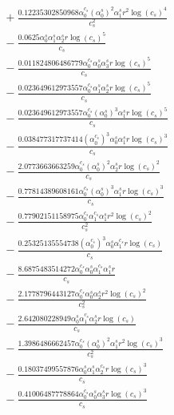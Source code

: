 \documentclass[10pt]{article}
\begin{document}
\begin{align*}
&{}  + \frac{0.12235302850968 \alpha_{0}^{c_s} \left(\alpha_{0}^s\right)^{2} \alpha_{1}^s r^{2} \log{\left(c_{s} \right)}^{4}}{c_{s}^{2}} \\
&{}  - \frac{0.0625 \alpha_{0}^s \alpha_{1}^s \alpha_{2}^s r \log{\left(c_{s} \right)}^{5}}{c_{s}} \\
&{}  - \frac{0.011824806486779 \alpha_{0}^{c_s} \alpha_{0}^s \alpha_{3}^s r \log{\left(c_{s} \right)}^{5}}{c_{s}} \\
&{}  - \frac{0.023649612973557 \alpha_{0}^{c_s} \alpha_{1}^s \alpha_{2}^s r \log{\left(c_{s} \right)}^{5}}{c_{s}} \\
&{}  - \frac{0.023649612973557 \alpha_{0}^{c_s} \left(\alpha_{0}^s\right)^{3} \alpha_{1}^s r \log{\left(c_{s} \right)}^{5}}{c_{s}} \\
&{}  - \frac{0.038477317737414 \left(\alpha_{0}^{c_s}\right)^{3} \alpha_{0}^s \alpha_{1}^s r \log{\left(c_{s} \right)}^{3}}{c_{s}} \\
&{}  - \frac{2.0773663663259 \alpha_{0}^{c_s} \left(\alpha_{0}^s\right)^{2} \alpha_{2}^s r \log{\left(c_{s} \right)}^{2}}{c_{s}} \\
&{}  - \frac{0.77814389608161 \alpha_{0}^{c_s} \left(\alpha_{0}^s\right)^{3} \alpha_{1}^s r \log{\left(c_{s} \right)}^{3}}{c_{s}} \\
&{}  - \frac{0.77902151158975 \alpha_{0}^{c_s} \alpha_{1}^{c_s} \alpha_{1}^s r^{2} \log{\left(c_{s} \right)}^{2}}{c_{s}^{2}} \\
&{}  - \frac{0.25325135554738 \left(\alpha_{0}^{c_s}\right)^{3} \alpha_{0}^s \alpha_{1}^{c_s} r \log{\left(c_{s} \right)}}{c_{s}} \\
&{}  - \frac{8.6875483514272 \alpha_{0}^{c_s} \alpha_{0}^s \alpha_{1}^{c_s} \alpha_{1}^s r}{c_{s}} \\
&{}  - \frac{2.1778796443127 \alpha_{0}^{c_s} \alpha_{0}^s \alpha_{2}^s r^{2} \log{\left(c_{s} \right)}^{2}}{c_{s}^{2}} \\
&{}  - \frac{2.642080228949 \alpha_{0}^s \alpha_{1}^{c_s} \alpha_{2}^s r \log{\left(c_{s} \right)}}{c_{s}} \\
&{}  - \frac{1.3986486662457 \alpha_{0}^{c_s} \left(\alpha_{0}^s\right)^{2} \alpha_{1}^s r^{2} \log{\left(c_{s} \right)}^{3}}{c_{s}^{2}} \\
&{}  - \frac{0.18037499557876 \alpha_{0}^s \alpha_{1}^s \alpha_{2}^{c_s} r \log{\left(c_{s} \right)}^{3}}{c_{s}} \\
&{}  - \frac{0.41006487778864 \alpha_{0}^{c_s} \alpha_{0}^s \alpha_{3}^s r \log{\left(c_{s} \right)}^{3}}{c_{s}} \\

\end{align*}
\end{document}
